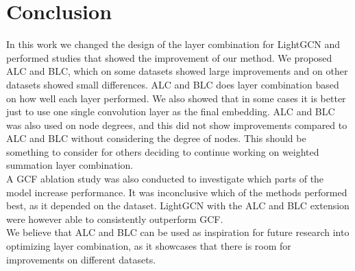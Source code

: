 \section{Conclusion}
In this work we changed the design of the layer combination for LightGCN and performed studies that showed the improvement of our method.
We proposed ALC and BLC, which on some datasets showed large improvements and on other datasets showed small differences.
ALC and BLC does layer combination based on how well each layer performed.
We also showed that in some cases it is better just to use one single convolution layer as the final embedding.
ALC and BLC was also used on node degrees, and this did not show improvements compared to ALC and BLC without considering the degree of nodes.
This should be something to consider for others deciding to continue working on weighted summation layer combination.\\
A GCF ablation study was also conducted to investigate which parts of the model increase performance.
It was inconclusive which of the methods performed best, as it depended on the dataset.
LightGCN with the ALC and BLC extension were however able to consistently outperform GCF.\\
We believe that ALC and BLC can be used as inspiration for future research into optimizing layer combination, as it showcases that there is room for improvements on different datasets.
